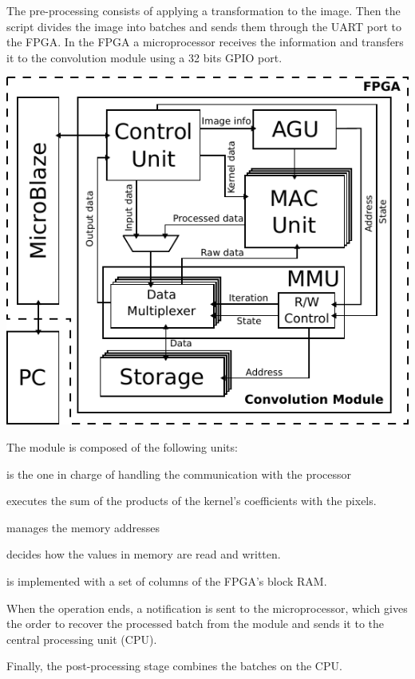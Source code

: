 \documentclass[a1paper,portrait,fontscale=0.43]{baposter}
\begin{document}
\begin{poster}
{The pre-processing consists of applying
a transformation to the image. Then the script divides the
image into batches and sends them through the UART port to the FPGA. In the FPGA a microprocessor receives the
information and transfers it to the convolution module using a 32 bits GPIO port. 
\begin{multicols}{2}
  \begin{center}
  \hfill\break
  \includegraphics[width=\linewidth]{general}
  \label{general}
  \end{center}
  \vfill\null
  \columnbreak
  The module is composed of the following units:
  \begin{description}
    \setlength{\itemsep}{1pt}
    \setlength{\parskip}{0pt}
    \setlength{\parsep}{0pt}
  \item[Control Unit] is the one in charge of handling the communication with
    the processor
  \item[Multiplier-Accumulator (MAC) Unit] executes the sum of the products of the kernel's coefficients with the pixels.
  \item[Address Generation Unit (AGU)] manages the memory addresses
  \item[Memory Management Unit (MMU)] decides how the values in memory are read and written.
  \item[Storage] is implemented with a set of columns of the FPGA's block RAM. 
  \end{description}
  When the operation ends, a notification is sent to the microprocessor, which
  gives the order to recover the processed batch from the module and sends it to
  the central processing unit (CPU). \end{multicols} Finally, the
post-processing stage combines the batches on the CPU.

}
\end{poster}
\end{document}
